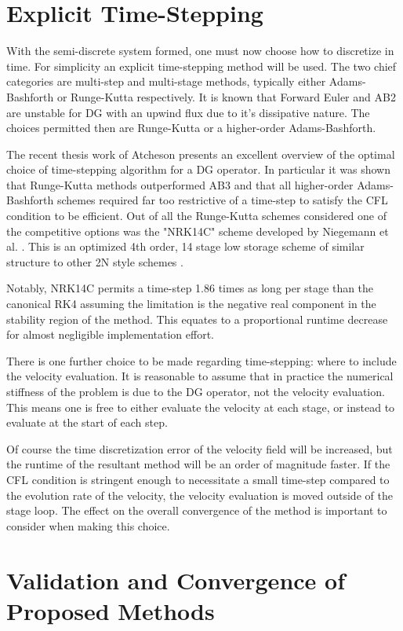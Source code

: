 \documentclass[letterpaper,12pt]{report}
\begin{document}
\section{Explicit Time-Stepping}
With the semi-discrete system formed, one must now choose how to discretize in time. For simplicity an explicit time-stepping method will be used. The two chief categories are multi-step and multi-stage methods, typically either Adams-Bashforth or Runge-Kutta respectively. It is known that Forward Euler and AB2 are unstable for DG with an upwind flux due to it's dissipative nature. The choices permitted then are Runge-Kutta or a higher-order Adams-Bashforth.

The recent thesis work of Atcheson \cite{Reid} presents an excellent overview of the optimal choice of time-stepping algorithm for a DG operator. In particular it was shown that Runge-Kutta methods outperformed AB3 and that all higher-order Adams-Bashforth schemes required far too restrictive of a time-step to satisfy the CFL condition to be efficient. Out of all the Runge-Kutta schemes considered \cite{Toulorge} one of the competitive options was the "NRK14C" scheme developed by Niegemann et al. \cite{Niegemann}. This is an optimized 4th order, 14 stage low storage scheme of similar structure to other 2N style schemes \cite{Carpenter}.

Notably, NRK14C permits a time-step 1.86 times as long per stage than the canonical RK4 assuming the limitation is the negative real component in the stability region of the method. This equates to a proportional runtime decrease for almost negligible implementation effort. 

There is one further choice to be made regarding time-stepping: where to include the velocity evaluation. It is reasonable to assume that in practice the numerical stiffness of the problem is due to the DG operator, not the velocity evaluation. This means one is free to either evaluate the velocity at each stage, or instead to evaluate at the start of each step. 

Of course the time discretization error of the velocity field will be increased, but the runtime of the resultant method will be an order of magnitude faster. If the CFL condition is stringent enough to necessitate a small time-step compared to the evolution rate of the velocity, the velocity evaluation is moved outside of the stage loop. The effect on the overall convergence of the method is important to consider when making this choice.

%
\section{Validation and Convergence of Proposed Methods}
\end{document}
